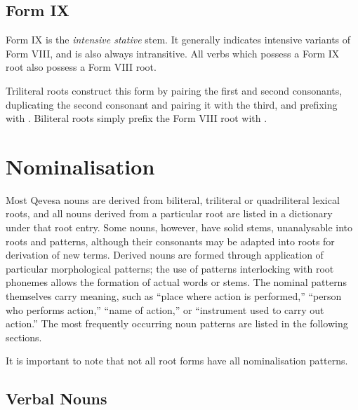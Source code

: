 \documentclass[grammar]{subfiles}
\begin{document}
  \subsection{Form IX}
  \label{ssec:dev_verb_form_ix}

  Form IX is the \emph{intensive stative} stem. 
  It generally indicates intensive variants of Form VIII, and is also always intransitive.
  All verbs which possess a Form IX root also possess a Form VIII root.

  Triliteral roots construct this form by pairing the first and second consonants, duplicating the second consonant and pairing it with the third, and prefixing with . Biliteral roots simply prefix the Form VIII root with .

%

  \section{Nominalisation}
  \label{sec:dev_nominalisation}

  Most Qevesa nouns are derived from biliteral, triliteral or quadriliteral lexical roots, and all nouns derived from a particular root are listed in a dictionary under that root entry. 
  Some nouns, however, have solid stems, unanalysable into roots and patterns, although their consonants may be adapted into roots for derivation of new terms. 
  Derived nouns are formed through application of particular morphological patterns; the use of patterns interlocking with root phonemes allows the formation of actual words or stems. 
  The nominal patterns themselves carry meaning, such as “place where action is performed,” “person who performs action,” “name of action,” or “instrument used to carry out action.” 
  The most frequently occurring noun patterns are listed in the following sections.

  It is important to note that not all root forms have all nominalisation patterns.

  \subsection{Verbal Nouns}
  \label{ssec:dev_verbal_nouns}
\end{document}
